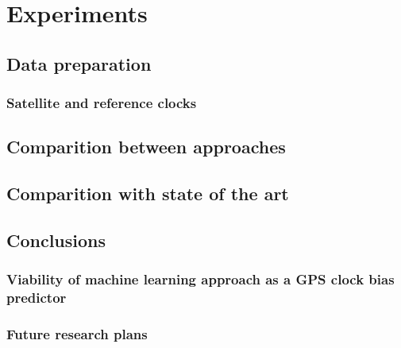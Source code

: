 \chapter{Experiments}


\section{Data preparation}

\subsection{Satellite and reference clocks}

\section{Comparition between approaches}


\section{Comparition with state of the art}


\section{Conclusions}

\subsection{Viability of machine learning approach as a GPS clock bias predictor}

\subsection{Future research plans}


